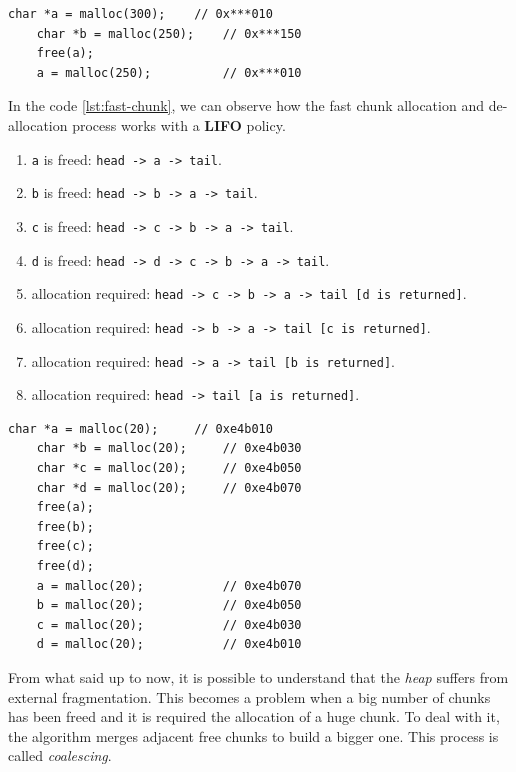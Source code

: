 \documentclass{article}
\numberwithin{equation}{subsection}
\begin{document}
\begin{minipage}{\textwidth}
\centering
    \lstset{style=cstyle}
    \begin{lstlisting}[caption={Non-fast chunk allocation and de-allocation.},captionpos=b,label={lst:non-fast-chunk}]
    char *a = malloc(300);    // 0x***010
    char *b = malloc(250);    // 0x***150
    free(a);
    a = malloc(250);          // 0x***010
\end{lstlisting}
\end{minipage}
\noindent
In the code \ref{lst:fast-chunk}, we can observe how the fast chunk allocation and de-allocation process works with a \textbf{LIFO} policy.
\begin{enumerate}
    \item \texttt{a} is freed: \texttt{head -> a -> tail}.
    \item \texttt{b} is freed: \texttt{head -> b -> a -> tail}.
    \item \texttt{c} is freed: \texttt{head -> c ->  b -> a -> tail}.
    \item \texttt{d} is freed: \texttt{head -> d -> c ->  b -> a -> tail}.
    \item allocation required: \texttt{head -> c ->  b -> a -> tail [d is returned]}.
    \item allocation required: \texttt{head ->  b -> a -> tail [c is returned]}.
    \item allocation required: \texttt{head -> a -> tail [b is returned]}.
    \item allocation required: \texttt{head -> tail [a is returned]}.
\end{enumerate}

\begin{minipage}{\textwidth}
\centering
    \lstset{style=cstyle}
    \begin{lstlisting}[caption={Fast chunk allocation and de-allocation.},captionpos=b,label={lst:fast-chunk}]
    char *a = malloc(20);     // 0xe4b010
    char *b = malloc(20);     // 0xe4b030
    char *c = malloc(20);     // 0xe4b050
    char *d = malloc(20);     // 0xe4b070
    free(a);
    free(b);
    free(c);
    free(d);
    a = malloc(20);           // 0xe4b070
    b = malloc(20);           // 0xe4b050
    c = malloc(20);           // 0xe4b030
    d = malloc(20);           // 0xe4b010
\end{lstlisting}
\end{minipage}
\noindent
From what said up to now, it is possible to understand that the \emph{heap} suffers from external fragmentation. This becomes a problem when a big number of chunks has been freed and it is required the allocation of a huge chunk. To deal with it, the algorithm merges adjacent free chunks to build a bigger one. This process is called \emph{coalescing}.
\end{document}

